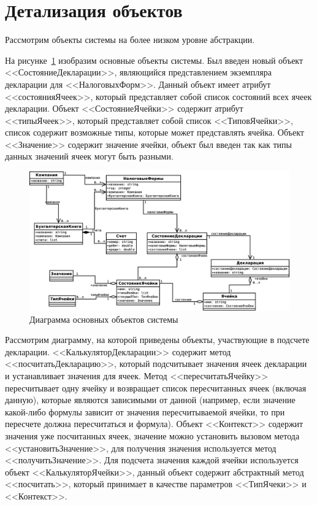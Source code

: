 \documentclass[14pt,a4paper]{reportmod}
\begin{document}
\section{Детализация объектов}
Рассмотрим объекты системы на более низком уровне абстракции.

На рисунке~\ref{pic:classes_1} изобразим основные объекты системы. Был введен новый объект <<СостояниеДекларации>>, являющийся представлением экземпляра декларации для <<НалоговыхФорм>>. Данный объект имеет атрибут <<состоянияЯчеек>>, который представляет собой список состояний всех ячеек декларации. Объект <<СостояниеЯчейки>> содержит атрибут <<типыЯчеек>>, который представляет собой список <<ТиповЯчейки>>, список содержит возможные типы, которые может представлять ячейка. Объект <<Значение>> содержит значение ячейки, объект был введен так как типы данных значений ячеек могут быть разными.

\begin{figure}
  \centering
  \includegraphics[scale=0.4]{uml/_classes_1}
  \caption{Диаграмма основных объектов системы}
  \label{pic:classes_1}
\end{figure}

Рассмотрим диаграмму, на которой приведены объекты, участвующие в подсчете декларации. <<КалькуляторДекларации>> содержит метод <<посчитатьДекларацию>>, который подсчитывает значения ячеек декларации и устанавливает значения для ячеек. Метод <<пересчитатьЯчейку>> пересчитывает одну ячейку и возвращает список пересчитанных ячеек (включая данную), которые являются зависимыми от данной (например, если значение какой-либо формулы зависит от значения пересчитываемой ячейки, то при пересчете должна пересчитаться и формула). Объект <<Контекст>>  содержит значения уже посчитанных ячеек, значение можно установить вызовом метода <<установитьЗначение>>, для получения значения используется метод <<получитьЗначение>>. Для подсчета значения каждой ячейки используется объект <<КалькуляторЯчейки>>, данный объект содержит абстрактный метод <<посчитать>>, который принимает в качестве параметров <<ТипЯчеки>> и <<Контекст>>.
\end{document}
